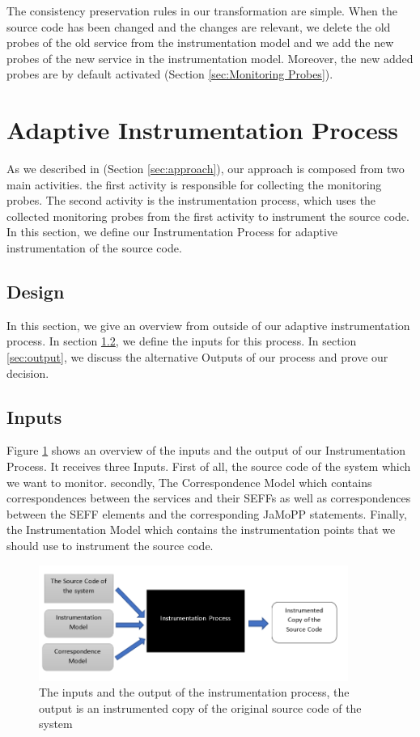 The consistency preservation rules in our transformation are simple. When the source code has been changed and the changes are relevant, we delete the old probes of the old service from the instrumentation model and we add the new probes of the new service in the instrumentation model. Moreover, the new added probes are by default activated (Section \ref{sec:Monitoring Probes}). 

\section{Adaptive Instrumentation Process}
\label{sec:Adaptive Instrumentation Process}
As we described in (Section \ref{sec:approach}), our approach is composed from two main activities. the first activity is responsible for collecting the monitoring probes. The second activity is the instrumentation process, which uses the collected monitoring probes from the first activity to instrument the source code. In this section, we define our Instrumentation Process for adaptive instrumentation of the source code.
 
\subsection{Design}
\label{sec:Design}
In this section, we give an overview from outside of our adaptive instrumentation process. In section \ref{sec:Inputs}, we define the inputs for this process. In section \ref{sec:output}, we discuss the alternative Outputs of our process and prove our decision. 
\subsection{Inputs}
\label{sec:Inputs}
Figure \ref{fig:approach_design} shows an overview of the inputs and the output of our Instrumentation Process. It receives three Inputs. First of all, the source code of the system which we want to monitor. secondly, The Correspondence Model which contains correspondences between the services and their SEFFs as well as correspondences between the SEFF elements and the corresponding JaMoPP statements. Finally, the Instrumentation Model which contains the instrumentation points that we should use to instrument the source code. 

\begin{figure}[h]
\centering
\includegraphics[width=0.9\textwidth]{figures/approach_design}
\caption{The inputs and the output of the instrumentation process, the output is an instrumented copy of the original source code of the system}
\label{fig:approach_design}
\end{figure}

